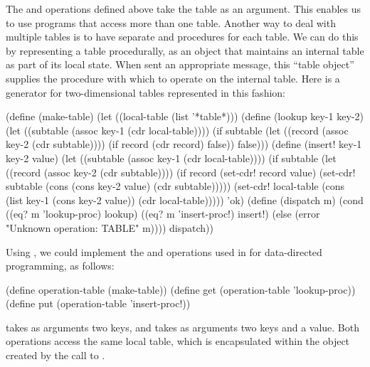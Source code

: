 The  and  operations defined above take the table as
an argument.  This enables us to use programs that access more than one table.
Another way to deal with multiple tables is to have separate  and
 procedures for each table.  We can do this by representing a
table procedurally, as an object that maintains an internal table as part of
its local state.  When sent an appropriate message, this ``table object''
supplies the procedure with which to operate on the internal table.  Here is a
generator for two-dimensional tables represented in this fashion:

\begin{codeBlock}
(define (make-table)
  (let ((local-table (list '*table*)))
    (define (lookup key-1 key-2)
      (let ((subtable
              (assoc key-1 (cdr local-table))))
        (if subtable
            (let ((record
                    (assoc key-2 (cdr subtable))))
              (if record (cdr record) false))
            false)))
    (define (insert! key-1 key-2 value)
      (let ((subtable
              (assoc key-1 (cdr local-table))))
        (if subtable
            (let ((record
                    (assoc key-2 (cdr subtable))))
              (if record
                  (set-cdr! record value)
                  (set-cdr! subtable
                            (cons (cons key-2 value)
                                  (cdr subtable)))))
            (set-cdr! local-table
                      (cons (list key-1
                                  (cons key-2 value))
                            (cdr local-table)))))
      'ok)
    (define (dispatch m)
      (cond ((eq? m 'lookup-proc) lookup)
            ((eq? m 'insert-proc!) insert!)
            (else
              (error "Unknown operation: TABLE"
                     m))))
    dispatch))
\end{codeBlock}

\noindent
Using , we could implement the  and 
operations used in  for data-directed programming, as
follows:

\begin{codeBlock}
(define operation-table (make-table))
(define get (operation-table 'lookup-proc))
(define put (operation-table 'insert-proc!))
\end{codeBlock}

\noindent
{} takes as arguments two keys, and  takes as arguments two
keys and a value.  Both operations access the same local table, which is
encapsulated within the object created by the call to .

